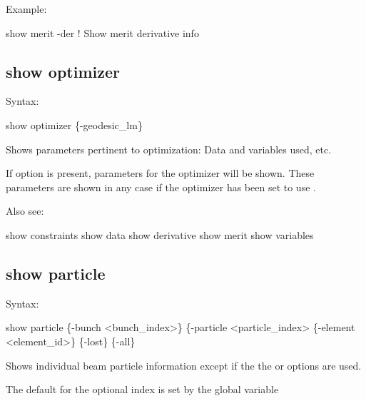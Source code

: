 {{{{{{{{Example:
\begin{example}
  show merit -der     ! Show merit derivative info
\end{example}


\subsection{show optimizer}
\label{s:show.optimizer}

Syntax:
\begin{example}
  show optimizer \{-geodesic_lm\}
\end{example}


Shows parameters pertinent to optimization: Data and variables used,
etc. 

If  option is present, parameters for the  optimizer will
be shown. These parameters are shown in any case if the optimizer has been set to use
.

Also see:
\begin{example}
  show constraints
  show data
  show derivative
  show merit
  show variables
\end{example}


\subsection{show particle}
\label{s:show.particle}

Syntax:
\begin{example}
    show particle \{-bunch <bunch_index>\} \{-particle <particle_index>
                  \{-element <element_id>\} \{-lost\} \{-all\}
\end{example}


Shows individual beam particle information except if the the  or  options are used. 

The default for the optional  index is set by the global variable \vn{global%
The default \vn{-element} is \vn{init} which is the initial beam distribution.
The default \vn{-particle} to show is the particle with index 1.

The \vn{-lost} option shows which particles are lost during beam tracking. Note: Using the
\vn{-lost} option results in one line printed for each lost particle. It is thus meant for use with
bunches with a small number of particles.

}}}}}}}}}
